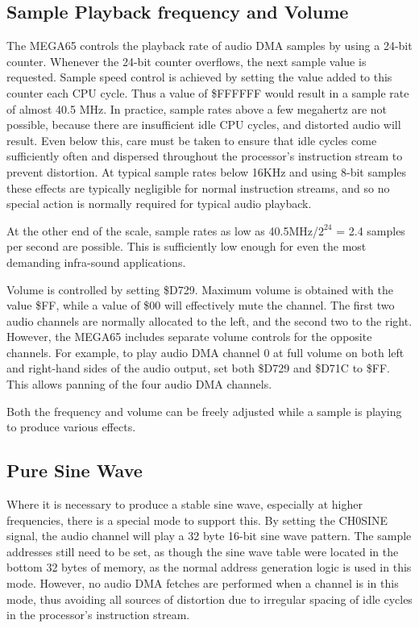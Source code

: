 \subsection{Sample Playback frequency and Volume}

The MEGA65 controls the playback rate of audio DMA samples by using a
24-bit counter.  Whenever the 24-bit counter overflows, the next
sample value is requested. Sample speed control is achieved by setting the
value added to this counter each CPU cycle.  Thus a value of
\$FFFFFF would result in a sample rate of almost 40.5 MHz.  In
practice, sample rates above a few megahertz are not possible, because
there are insufficient idle CPU cycles, and distorted audio will
result.  Even below this, care must be taken to ensure that idle
cycles come sufficiently often and dispersed throughout the
processor's instruction stream to prevent distortion.  At typical
sample rates below 16KHz and using 8-bit samples these effects are
typically negligible for normal instruction streams, and so no special
action is normally required for typical audio playback.

At the other end of the scale, sample rates as low as 40.5MHz/$2^{24}$
= 2.4 samples per second are possible.  This is sufficiently low
enough for even the most demanding infra-sound applications.

Volume is controlled by setting \$D729.  Maximum volume is obtained
with the value \$FF, while a value of \$00 will effectively mute the
channel.  The first two audio channels are normally allocated to the
left, and the second two to the right.  However, the MEGA65 includes
separate volume controls for the opposite channels. For example, to
play audio DMA channel 0 at full volume on both left and right-hand sides
of the audio output, set both \$D729 and \$D71C to \$FF.  This allows
panning of the four audio DMA channels.

Both the frequency and volume can be freely adjusted while a sample is playing
to produce various effects.

\subsection{Pure Sine Wave}

Where it is necessary to produce a stable sine wave, especially at
higher frequencies,
there is a special mode to support this. By setting the CH0SINE
signal, the audio channel will play a 32 byte 16-bit sine wave
pattern.  The sample addresses still need to be set, as though the
sine wave table were located in the bottom 32 bytes of memory, as the
normal address generation logic is used in this mode. However, no
audio DMA fetches are performed when a channel is in this mode, thus
avoiding all sources of distortion due to irregular spacing of idle
cycles in the processor's instruction stream.

